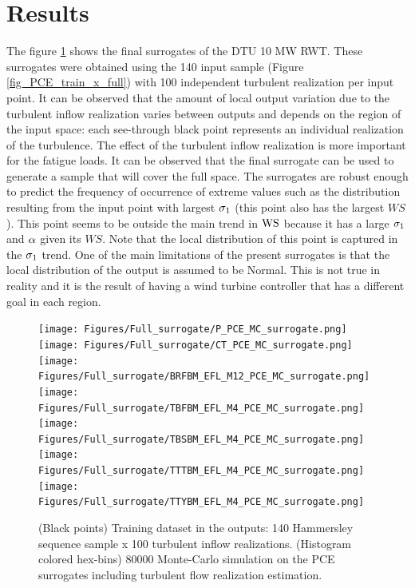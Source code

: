 \documentclass[preprint,12pt]{elsarticle}
\begin{document}
\section{Results}


The figure \ref{fig_final_surrogates} shows the final surrogates of the DTU 10 MW RWT. These surrogates were obtained using the 140 input sample (Figure \ref{fig_PCE_train_x_full}) with 100 independent turbulent realization per input point. It can be observed that the amount of local output variation due to the turbulent inflow realization varies between outputs and depends on the region of the input space: each see-through black point represents an individual realization of the turbulence. The effect of the turbulent inflow realization is more important for the fatigue loads. It can be observed that the final surrogate can be used to generate a sample that will cover the full space. The surrogates are robust enough to predict the frequency of occurrence of extreme values such as the distribution resulting from the input point with largest $\sigma_{1}$ (this point also has the largest $WS$). This point seems to be outside the main trend in $\text{WS}$ because it has a large $\sigma_{1}$ and $\alpha$ given its $WS$. Note that the local distribution of this point is captured in the $\sigma_{1}$ trend. One of the main limitations of the present surrogates is that the local distribution of the output is assumed to be Normal. This is not true in reality and it is the result of having a wind turbine controller that has a different goal in each region.

\begin{figure}[h!]
\begin{centering}
\texttt{[image: Figures/Full\_surrogate/P\_PCE\_MC\_surrogate.png]} \\
\texttt{[image: Figures/Full\_surrogate/CT\_PCE\_MC\_surrogate.png]} \\
\texttt{[image: Figures/Full\_surrogate/BRFBM\_EFL\_M12\_PCE\_MC\_surrogate.png]} \\
\texttt{[image: Figures/Full\_surrogate/TBFBM\_EFL\_M4\_PCE\_MC\_surrogate.png]} \\
\texttt{[image: Figures/Full\_surrogate/TBSBM\_EFL\_M4\_PCE\_MC\_surrogate.png]} \\
\texttt{[image: Figures/Full\_surrogate/TTTBM\_EFL\_M4\_PCE\_MC\_surrogate.png]} \\
\texttt{[image: Figures/Full\_surrogate/TTYBM\_EFL\_M4\_PCE\_MC\_surrogate.png]}
\caption{(Black points) Training dataset in the outputs: 140 Hammersley sequence sample x 100 turbulent inflow realizations. (Histogram colored hex-bins) 80000 Monte-Carlo simulation on the PCE surrogates including turbulent flow realization estimation.}
\label{fig_final_surrogates}
\end{centering}
\end{figure}
\end{document}

